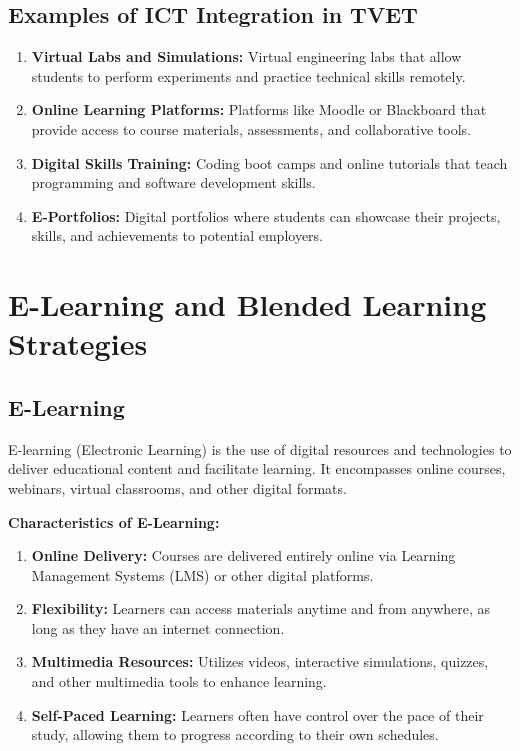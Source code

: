 \documentclass[10pt]{article}
\begin{document}
\subsection*{Examples of ICT Integration in TVET}

\begin{enumerate}
    \item \textbf{Virtual Labs and Simulations:} Virtual engineering labs that allow students to perform experiments and practice technical skills remotely.
    \item \textbf{Online Learning Platforms:} Platforms like Moodle or Blackboard that provide access to course materials, assessments, and collaborative tools.
    \item \textbf{Digital Skills Training:} Coding boot camps and online tutorials that teach programming and software development skills.
    \item \textbf{E-Portfolios:} Digital portfolios where students can showcase their projects, skills, and achievements to potential employers.
\end{enumerate}

\section*{E-Learning and Blended Learning Strategies}

\subsection*{E-Learning}

E-learning (Electronic Learning) is the use of digital resources and technologies to deliver educational content and facilitate learning. It encompasses online courses, webinars, virtual classrooms, and other digital formats.

\textbf{Characteristics of E-Learning:}
\begin{enumerate}[label=\roman*.]
    \item \textbf{Online Delivery:} Courses are delivered entirely online via Learning Management Systems (LMS) or other digital platforms.
    \item \textbf{Flexibility:} Learners can access materials anytime and from anywhere, as long as they have an internet connection.
    \item \textbf{Multimedia Resources:} Utilizes videos, interactive simulations, quizzes, and other multimedia tools to enhance learning.
    \item \textbf{Self-Paced Learning:} Learners often have control over the pace of their study, allowing them to progress according to their own schedules.
\end{enumerate}
\end{document}
